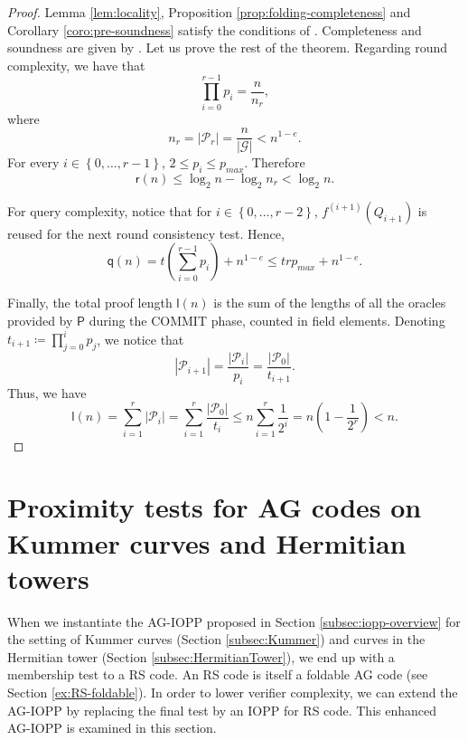 \documentclass[10pt,a4paper]{article}
\newcommand\prover{\mathsf{P}}
\newcommand{\set}[1]{\left\{#1\right\}}
\newcommand{\size}[1]{\left|#1\right|}
\newcommand{\range}[1]{\set{0,\dots,#1-1}}
\newcommand{\Range}[2]{\set{#1,\dots,#2}}
\newcommand\calP{\mathcal{P}}
\newcommand\calG{\mathcal{G}}
\newcommand\xpip[1]{#1^{(i+1)}}
\newcommand\mydef{\coloneqq}
\theoremstyle{plain}
\theoremstyle{plain}
\theoremstyle{definition}
\theoremstyle{remark}
\theoremstyle{plain}
\begin{document}
\begin{proof} Lemma \ref{lem:locality}, Proposition \ref{prop:folding-completeness} and Corollary \ref{coro:pre-soundness} satisfy the conditions of \cite[Theorem~1]{ABN21}. Completeness and soundness are given by \cite[Theorem~1]{ABN21}. Let us prove the rest of the theorem.  
	Regarding round complexity, we have that \[\prod_{i = 0}^{r-1} p_i = \frac{n}{n_r},\] where \[n_r = \size{\calP_r} = \frac{n}{\size{\calG}} < n^{1 - e}.\] For every $i \in \range{r}$, $2 \le p_i \le p_{max}$. Therefore \[\mathsf{r}(n) \le \log_2 n - \log_2 n_r < \log_2 n.\]  
	
	For query complexity, notice that for $i \in \Range{0}{r-2}$, $\xpip{f}(Q_{i+1})$ is reused for the next round consistency test.  Hence, \[\mathsf{q}(n) = t \left(\sum_{i = 0}^{r-1} p_i\right) + n^{1 - e} \le t r p_{max} + n^{1 - e}.\]
	
	
	Finally, the total proof length $\mathsf{l}(n)$ is the sum of the lengths of all the oracles provided by $\prover$ during the \textsf{COMMIT} phase, counted in field elements. Denoting $t_{i+1} \mydef \prod_{j = 0}^{i} p_j$, we notice that \[\size{\calP_{i+1}} = \frac{\size{\calP_i}}{p_i} = \frac{\size{\calP_0}}{t_{i+1}}.\] Thus, we have
	\[\mathsf{l}(n) = \sum_{i = 1}^{r}\size{\calP_{i}} = \sum_{i = 1}^{r} \frac{\size{\calP_0}}{t_i} \le n \sum_{i = 1}^{r} \frac{1}{2^{i}} = n \left(1 - \frac{1}{2^r}\right) < n.\]      
\end{proof}

\section{Proximity tests for AG codes on Kummer curves and Hermitian towers}\label{sec:kummer-iopp}

When we instantiate the AG-IOPP proposed in Section \ref{subsec:iopp-overview} for the setting of Kummer curves (Section \ref{subsec:Kummer}) and curves in the Hermitian tower (Section \ref{subsec:HermitianTower}), we end up with a membership test to a RS code. An RS code is itself a foldable AG code (see Section \ref{ex:RS-foldable}). In order to lower verifier complexity, we can extend the AG-IOPP by replacing the final test by an IOPP for RS code. This enhanced AG-IOPP is examined in this section.
\end{document}
